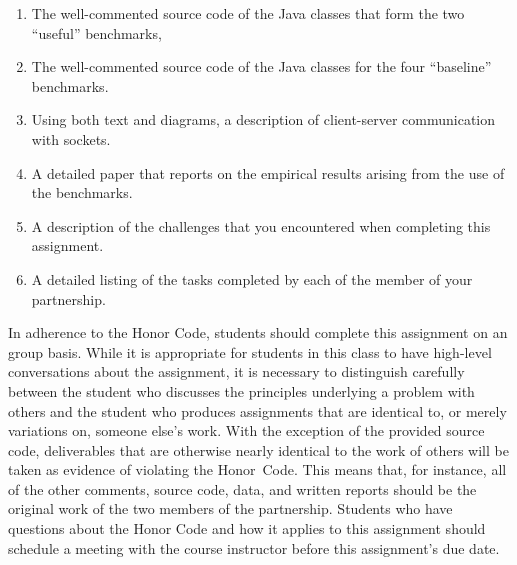 \begin{enumerate}

    \item The well-commented source code of the Java classes that form the two ``useful'' benchmarks,

    \item The well-commented source code of the Java classes for the four ``baseline'' benchmarks.

    \item Using both text and diagrams, a description of client-server communication with sockets.

    \item A detailed paper that reports on the empirical results arising from the use of the benchmarks.

    \item A description of the challenges that you encountered when completing this assignment.

    \item A detailed listing of the tasks completed by each of the member of your partnership.

\end{enumerate}

In adherence to the Honor Code, students should complete this assignment on an group basis. While it is appropriate
for students in this class to have high-level conversations about the assignment, it is necessary to distinguish
carefully between the student who discusses the principles underlying a problem with others and the student who produces
assignments that are identical to, or merely variations on, someone else's work.  With the exception of the provided
source code, deliverables that are otherwise nearly identical to the work of others will be taken as evidence of
violating the \mbox{Honor Code}. This means that, for instance, all of the other comments, source code, data, and
written reports should be the original work of the two members of the partnership. Students who have questions about the
Honor Code and how it applies to this assignment should schedule a meeting with the course instructor before this
assignment's due date.


